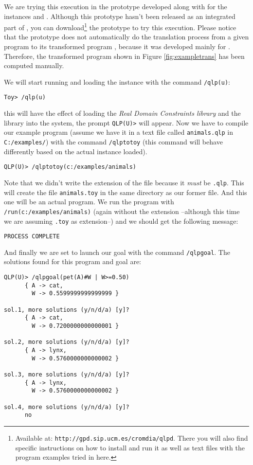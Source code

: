 \documentclass{sigplanconf}
\theoremstyle{definition}
\theoremstyle{plain}
\begin{document}
We are trying this execution in the prototype developed along with \cite{RR08} for the instances  and . Although this prototype hasn't been released as an integrated part of , you can download\footnote{Available at: \texttt{http://gpd.sip.ucm.es/cromdia/qlpd}. There you will also find specific instructions on how to install and run it as well as text files with the program examples tried in here.} the prototype to try this execution. Please notice that the prototype does not automatically do the translation process from a given  program  to its transformed program , because it was developed mainly for \cite{RR08}. Therefore, the transformed program shown in Figure \ref{fig:exampletrans} has been computed manually.

We will start running  and loading the  instance with the command \texttt{/qlp(u)}:

\begin{verbatim}
Toy> /qlp(u)
\end{verbatim}

\noindent this will have the effect of loading the \emph{Real Domain Constraints library} and the  library into the system, the prompt \texttt{QLP(U)>} will appear. Now we have to compile our example program (assume we have it in a text file called \texttt{animals.qlp} in \texttt{C:/examples/}) with the command \texttt{/qlptotoy} (this command will behave differently based on the actual instance loaded).

\begin{verbatim}
QLP(U)> /qlptotoy(c:/examples/animals)
\end{verbatim}

Note that we didn't write the extension of the file because it \emph{must} be \texttt{.qlp}. This will create the file \texttt{animals.toy} in the same directory as our former file. And this one will be an actual  program. We run the program with \texttt{/run(c:/examples/animals)} (again without the extension --although this time we are assuming \texttt{.toy} as extension--) and we should get the following message:

\begin{verbatim}
PROCESS COMPLETE
\end{verbatim}

And finally we are set to launch our goal with the command \texttt{/qlpgoal}. The solutions found for this program and goal are:

\begin{verbatim}
QLP(U)> /qlpgoal(pet(A)#W | W>=0.50)
      { A -> cat,
        W -> 0.5599999999999999 }

sol.1, more solutions (y/n/d/a) [y]?
      { A -> cat,
        W -> 0.7200000000000001 }

sol.2, more solutions (y/n/d/a) [y]?
      { A -> lynx,
        W -> 0.5760000000000002 }

sol.3, more solutions (y/n/d/a) [y]?
      { A -> lynx,
        W -> 0.5760000000000002 }

sol.4, more solutions (y/n/d/a) [y]?
      no
\end{verbatim}
\end{document}

